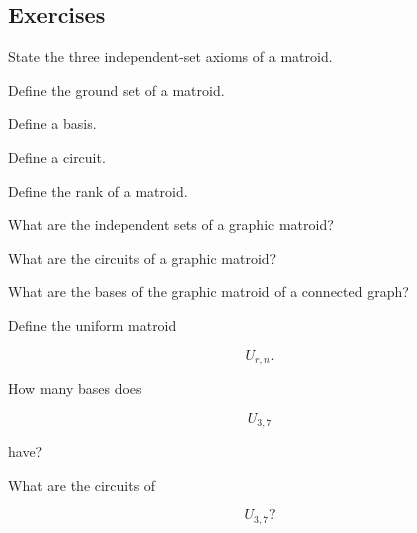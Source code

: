 \subsection{Exercises}
\label{subsec:matroid-exercises}

\begin{exercise}[1]
State the three independent-set axioms of a matroid.
\end{exercise}

\begin{exercise}[1]
Define the ground set of a matroid.
\end{exercise}

\begin{exercise}[1]
Define a basis.
\end{exercise}

\begin{exercise}[1]
Define a circuit.
\end{exercise}

\begin{exercise}[1]
Define the rank of a matroid.
\end{exercise}

\begin{exercise}[1]
What are the independent sets of a graphic matroid?
\end{exercise}

\begin{exercise}[1]
What are the circuits of a graphic matroid?
\end{exercise}

\begin{exercise}[1]
What are the bases of the graphic matroid of a connected graph?
\end{exercise}

\begin{exercise}[1]
Define the uniform matroid

\[
U_{r,n}.
\]
\end{exercise}

\begin{exercise}[1]
How many bases does

\[
U_{3,7}
\]

have?
\end{exercise}

\begin{exercise}[1]
What are the circuits of

\[
U_{3,7}?
\]
\end{exercise}

